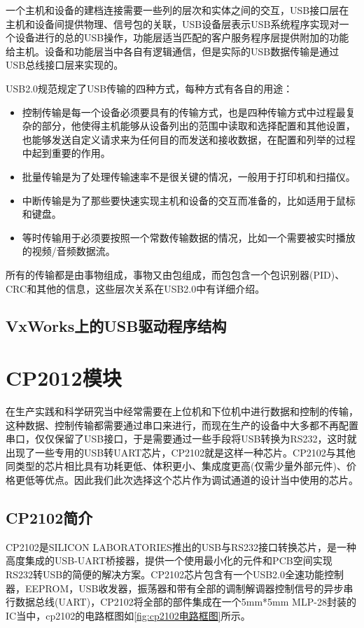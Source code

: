 	一个主机和设备的建档连接需要一些列的层次和实体之间的交互，USB接口层在主机和设备间提供物理、信号包的关联，USB设备层表示USB系统程序实现对一个设备进行的总的USB操作，功能层适当匹配的客户服务程序层提供附加的功能给主机。设备和功能层当中各自有逻辑通信，但是实际的USB数据传输是通过USB总线接口层来实现的\cite{USB开发手册}\cite{圈圈教你玩USB}。
	
	USB2.0规范规定了USB传输的四种方式，每种方式有各自的用途\cite{USB总线接口开发指南}：
\begin{itemize}
\item {}

	控制传输是每一个设备必须要具有的传输方式，也是四种传输方式中过程最复杂的部分，他使得主机能够从设备列出的范围中读取和选择配置和其他设置，也能够发送自定义请求来为任何目的而发送和接收数据，在配置和列举的过程中起到重要的作用。
\item {}
	
	批量传输是为了处理传输速率不是很关键的情况，一般用于打印机和扫描仪。
\item {}

	中断传输是为了那些要快速实现主机和设备的交互而准备的，比如适用于鼠标和键盘。
\item {}
	
	等时传输用于必须要按照一个常数传输数据的情况，比如一个需要被实时播放的视频/音频数据流。
\end{itemize}
所有的传输都是由事物组成，事物又由包组成，而包包含一个包识别器(PID)、CRC和其他的信息，这些层次关系在USB2.0中有详细介绍。


\subsection{VxWorks上的USB驱动程序结构}


\section{CP2012模块}
在生产实践和科学研究当中经常需要在上位机和下位机中进行数据和控制的传输，这种数据、控制传输都需要通过串口来进行，而现在生产的设备中大多都不再配置串口，仅仅保留了USB接口，于是需要通过一些手段将USB转换为RS232，这时就出现了一些专用的USB转UART芯片，CP2102就是这样一种芯片。CP2102与其他同类型的芯片相比具有功耗更低、体积更小、集成度更高(仅需少量外部元件)、价格更低等优点。因此我们此次选择这个芯片作为调试通道的设计当中使用的芯片。
\subsection{CP2102简介}
	CP2102是SILICON LABORATORIES推出的USB与RS232接口转换芯片，是一种高度集成的USB-UART桥接器，提供一个使用最小化的元件和PCB空间实现RS232转USB的简便的解决方案。CP2102芯片包含有一个USB2.0全速功能控制器，EEPROM，USB收发器，振荡器和带有全部的调制解调器控制信号的异步串行数据总线(UART)，CP2102将全部的部件集成在一个5mm*5mm MLP-28封装的IC当中\cite{CP2102}，cp2102的电路框图如\autoref{fig:cp2102电路框图}所示。

